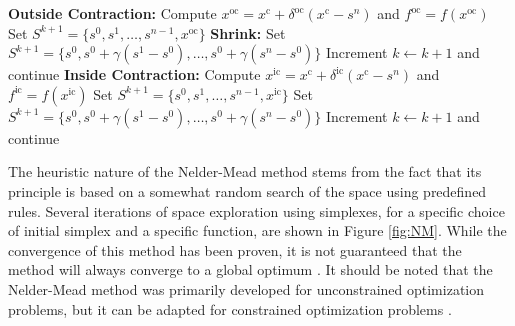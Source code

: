 \begin{algorithm}
\begin{algorithmic}[1]
		\State \textbf{Outside Contraction:} Compute $x^\text{oc} = x^\text{c} + \delta^{\text{oc}}(x^\text{c} - s^n)$ and $f^{\text{oc}} = f(x^{\text{oc}})$
		\State Set $S^{k+1} = \{s^0, s^1, \dots, s^{n-1}, x^{\text{oc}}\}$
		\Else
		\State \textbf{Shrink:} Set $S^{k+1} = \{s^0, s^0 + \gamma(s^1 - s^0), \dots, s^0 + \gamma(s^n - s^0)\}$
		\EndIf
		\State Increment $k \gets k+1$ and continue
		\Else
		\State \textbf{Inside Contraction:} Compute $x^{\text{ic}} = x^\text{c} + \delta^{\text{ic}}(x^\text{c} - s^n)$ and $f^{\text{ic}} = f(x^{\text{ic}})$
		\State Set $S^{k+1} = \{s^0, s^1, \dots, s^{n-1}, x^{\text{ic}}\}$
		\Else
		\State Set $S^{k+1} = \{s^0, s^0 + \gamma(s^1 - s^0), \dots, s^0 + \gamma(s^n - s^0)\}$
		\EndIf
		\State Increment $k \gets k+1$ and continue
		\EndIf
		\EndWhile
		\EndProcedure
	\end{algorithmic}
\end{algorithm}
%
The heuristic nature of the Nelder-Mead method stems from the fact that its principle is based on a somewhat random search of the space using predefined rules. Several iterations of space exploration using simplexes, for a specific choice of initial simplex and a specific function, are shown in Figure \ref{fig:NM}. While the convergence of this method has been proven, it is not guaranteed that the method will always converge to a global optimum \cite{BBO-textbook}. It should be noted that the Nelder-Mead method was primarily developed for unconstrained optimization problems, but it can be adapted for constrained optimization problems  \cite{BBO-textbook}.


